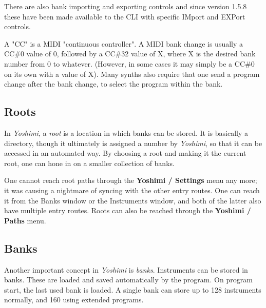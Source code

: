    There are also bank importing and exporting controls and since version 1.5.8
   these have been made available to the CLI with specific IMport and EXPort
   controls.

   A "CC" is a MIDI "continuous controller".
   A MIDI bank change is usually a CC\#0 value of 0, followed by a CC\#32
   value of X, where X is the desired bank number from 0 to whatever.
   (However, in some cases it may simply be a CC\#0 on its own with a value
    of X).  Many synths also require that one send a program change after
   the bank change, to select the program within the bank.

\subsection{Roots}
\label{subsec:banks_and_roots_roots}

   In \textsl{Yoshimi}, a \textsl{root} is a location in which banks can be
   stored.  It is basically a directory, though it ultimately is assigned a
   number by \textsl{Yoshimi}, so that it can be accessed in an automated
   way.  By choosing a root and making it the current root, one can hone in
   on a smaller collection of banks.

   One cannot reach root paths through the \textbf{Yoshimi / Settings} menu
   any more; it was causing a nightmare of syncing with the other entry
   routes. One can reach it from the Banks window
   or the Instruments window,
   and both of the latter also have multiple entry routes.
   Roots can also be reached through the \textbf{Yoshimi / Paths} menu.

\subsection{Banks}
\label{subsec:banks_and_roots_banks}

   Another important concept in \textsl{Yoshimi} is \textsl{banks}.  Instruments
   can be stored in banks. These are loaded and saved automatically by the
   program.  On program start, the last used bank is loaded. A single bank
   can store up to 128 instruments normally, and 160 using extended programs.


